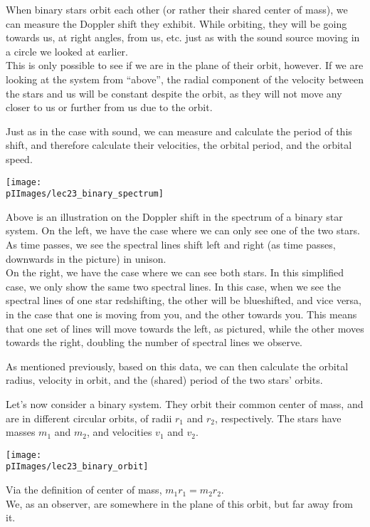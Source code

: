 When binary stars orbit each other (or rather their shared center of mass), we can measure the Doppler shift they exhibit. While orbiting, they will be going towards us, at right angles, from us, etc. just as with the sound source moving in a circle we looked at earlier.\\
This is only possible to see if we are in the plane of their orbit, however. If we are looking at the system from ``above'', the radial component of the velocity between the stars and us will be constant despite the orbit, as they will not move any closer to us or further from us due to the orbit.

Just as in the case with sound, we can measure and calculate the period of this shift, and therefore calculate their velocities, the orbital period, and the orbital speed.

\begin{center}
\texttt{[image: \\pIImages/lec23\_binary\_spectrum]}
\end{center}

Above is an illustration on the Doppler shift in the spectrum of a binary star system. On the left, we have the case where we can only see one of the two stars. As time passes, we see the spectral lines shift left and right (as time passes, downwards in the picture) in unison.\\
On the right, we have the case where we can see both stars. In this simplified case, we only show the same two spectral lines. In this case, when we see the spectral lines of one star redshifting, the other will be blueshifted, and vice versa, in the case that one is moving from you, and the other towards you. This means that one set of lines will move towards the left, as pictured, while the other moves towards the right, doubling the number of spectral lines we observe.

As mentioned previously, based on this data, we can then calculate the orbital radius, velocity in orbit, and the (shared) period of the two stars' orbits.

Let's now consider a binary system. They orbit their common center of mass, and are in different circular orbits, of radii $r_1$ and $r_2$, respectively. The stars have masses $m_1$ and $m_2$, and velocities $v_1$ and $v_2$.

\begin{center}
\texttt{[image: \\pIImages/lec23\_binary\_orbit]}
\end{center}

Via the definition of center of mass, $m_1 r_1 = m_2 r_2$.\\
We, as an observer, are somewhere in the plane of this orbit, but far away from it.

